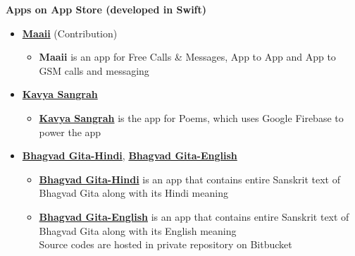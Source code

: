 \documentclass[letterpaper,11pt]{article}
\newcommand{\resitem}[1]{\item #1 \vspace{-2pt}}
\newcommand{\resheading}[1]{{\large \colorbox{mygrey}{\begin{minipage}{\textwidth}{\textbf{#1 \vphantom{p\^{E}}}}\end{minipage}}}}
\begin{document}
\resheading{Apps on App Store  \normalsize \bfseries (developed in Swift)}
\begin{itemize}
\resitem {\href{https://itunes.apple.com/hk/app/id488051175}{\bfseries Maaii} (Contribution)}
		{ \footnotesize
		\begin{itemize}
			\resitem{{\bfseries Maaii} is an app for Free Calls \& Messages, App to App and App to GSM calls and messaging}
		\end{itemize}
		}
\resitem {\href{https://itunes.apple.com/app/id1091530315} {\bfseries Kavya Sangrah}}
		{ \footnotesize
		\begin{itemize}
			\resitem{\href{https://itunes.apple.com/app/id1091530315}{\bfseries Kavya Sangrah} is the app for Poems, which uses Google Firebase to power the app}
		\end{itemize}
		}
\resitem {{\href{https://itunes.apple.com/app/id1099563171}{\bfseries Bhagvad Gita-Hindi}, \href{https://itunes.apple.com/app/id1099564538}{\bfseries Bhagvad Gita-English}}}
		{ \footnotesize
		\begin{itemize}
			\resitem{\href{https://itunes.apple.com/app/id1099563171}{\bfseries Bhagvad Gita-Hindi} is an app that contains entire Sanskrit text of Bhagvad Gita along with its Hindi meaning}
			\resitem{\href{https://itunes.apple.com/app/id1099564538}{\bfseries Bhagvad Gita-English} is an app that contains entire Sanskrit text of Bhagvad Gita along with its English meaning}\\
			{\tiny *Source codes are hosted in private repository on Bitbucket}
		\end{itemize}
		}
\end{itemize} 
\end{document}
